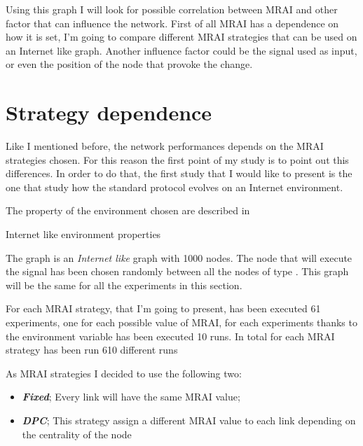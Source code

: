 Using this graph I will look for possible correlation between \ac{MRAI} and other
factor that can influence the network.
First of all \ac{MRAI} has a dependence on how it is set, I'm going to compare
different \ac{MRAI} strategies that can be used on an Internet like graph.
Another influence factor could be the signal used as input, or even the position 
of the node that provoke the change.

\section{Strategy dependence}
\label{sec:bgp_mrai_strategy_dependance}

Like I mentioned before, the network performances depends on the \ac{MRAI} strategies
chosen.
For this reason the first point of my study is to point out this differences.
In order to do that, the first study that I would like to present is the one
that study how the standard protocol evolves on an Internet environment.

The property of the environment chosen are described in 

\begin{table}[h]
	
	\caption{Internet like environment properties}
	\label{tbl:internet_like_properties}
\end{table}

The graph is an \textit{Internet like} graph with \num{1000} nodes.
The node that will execute the signal has been chosen randomly between 
all the nodes of type .
This graph will be the same for all the experiments in this section.

For each \ac{MRAI} strategy, that I'm going to present, has been executed \num{61}
experiments, one for each possible value of \ac{MRAI}, for each experiments
thanks to the environment variable has been executed \num{10} runs.
In total for each \ac{MRAI} strategy has been run \num{610} different runs

As \ac{MRAI} strategies I decided to use the following two:
\begin{itemize}
	\item \textbf{\textit{Fixed}}; Every link will have the same
		\ac{MRAI} value;
	\item \textbf{\textit{DPC}}; This strategy assign a different 
		\ac{MRAI} value to each link depending on the centrality of the node \cite{milani2020improving}
\end{itemize}

